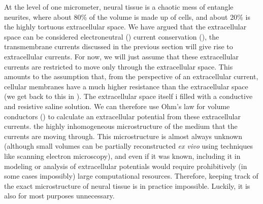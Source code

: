 {At the level of one micrometer, neural tissue is a chaotic mess of entangle neurites, where about 80\% of the volume is made up of cells, and about 20\% is the highly tortuous extracellular space. 
We have argued that the extracellular space  can be considered electroneutral () current conservation (),  the transmembrane currents 
discussed in the previous section will give rise to extracellular currents.
For now, we will just assume that these extracellular currents are restricted to move only through the extracellular space. This amounts to the assumption that, from the perspective of an extracellular current, cellular membranes have a much higher resistance than the extracellular space (we get back to this in ). 
The extracellular space itself i filled with a conductive and resistive saline solution. We
can therefore use Ohm's law for volume conductors () to calculate an extracellular potential from these extracellular currents.  the highly inhomogeneous microstructure of the medium that the currents are moving through. 
This microstructure is almost always unknown (although small volumes can be partially reconstructed {\it ex vivo} using techniques like scanning electron microscopy), and even if it was known, including it in modeling or analysis of extracellular potentials would require prohibitively (in some cases impossibly) large computational resources.
Therefore, keeping track of the exact microstructure of neural tissue is in practice impossible. Luckily, it is also for most purposes unnecessary. 
}
